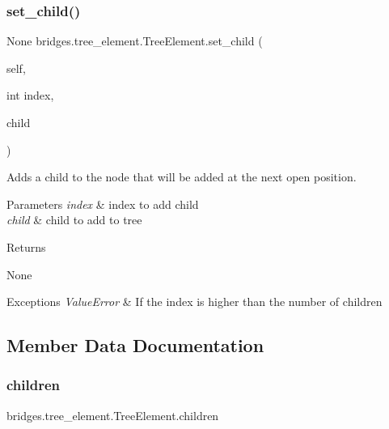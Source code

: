 \subsubsection{\texorpdfstring{set\_child()}{set\_child()}}
{\footnotesize\ttfamily  None bridges.\+tree\+\_\+element.\+Tree\+Element.\+set\+\_\+child (\begin{DoxyParamCaption}\item[{}]{self,  }\item[{int}]{index,  }\item[{}]{child }\end{DoxyParamCaption})}



Adds a child to the node that will be added at the next open position. 


\begin{DoxyParams}{Parameters}
{\em index} & index to add child \\
\hline
{\em child} & child to add to tree \\
\hline
\end{DoxyParams}
\begin{DoxyReturn}{Returns}


None
\end{DoxyReturn}

\begin{DoxyExceptions}{Exceptions}
{\em Value\+Error} & If the index is higher than the number of children \\
\hline
\end{DoxyExceptions}


\subsection{Member Data Documentation}
\mbox{\label{classbridges_1_1tree__element_1_1_tree_element_a09e0e8ad32395e004b6b2d12c39ce390}} 
\subsubsection{\texorpdfstring{children}{children}}
{\footnotesize\ttfamily bridges.\+tree\+\_\+element.\+Tree\+Element.\+children}

\mbox{\label{classbridges_1_1tree__element_1_1_tree_element_a35214b444048a585452a8451cd23c802}} 
